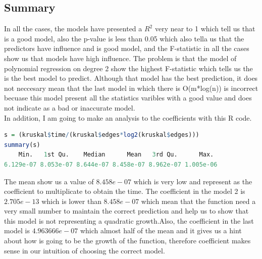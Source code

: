 \documentclass{article}
\begin{document}
\subsection{Summary}
In all the cases, the models have presented a $R^{2}$ very near to 1 which tell us that is a good model, also the p-value is less than 0.05 which also tella us that the predictors have influence and is good model, and the F-statistic in all the cases show us that models have high influence. The problem is that the model of polynomial regression on degree 2 show the highest F-statistic which tells us the is the best model to predict. Although that model has the best prediction, it does not neccesary mean that the last model in which there is O(m*log(n)) is incorrect becuase this model present all the statistics varibles with a good value and does not indicate as a bad or inaccurate model.
\\
\lstset{
numbers=left,
numberstyle=\small,
numbersep=8pt,
language=R,
framexleftmargin=2pt}
In addition, I am going to make an analysis to the coefficients with this R code.
\begin{lstlisting}[language=R]
s = (kruskal$time/(kruskal$edges*log2(kruskal$edges)))
summary(s)
    Min.   1st Qu.    Median      Mean   3rd Qu.      Max.
6.129e-07 8.053e-07 8.644e-07 8.458e-07 8.962e-07 1.005e-06
\end{lstlisting}
The mean show us a value of $8.458e-07$ which is very low and represent as the coefficient to multiplicate to obtain the time. The coefficient in the model 2 is $2.705e-13$ which is lower than  $8.458e-07$ which mean that the function need a very small number to maintain the correct prediction and help us to show that this model is not representing a quadratic growth.Also, the coefficient in the last model is $4.963666e-07$ which almost half of the mean and it gives us a hint about how is going to be the growth of the function, therefore coefficient makes sense in our intuition of choosing the correct model.
\end{document}
